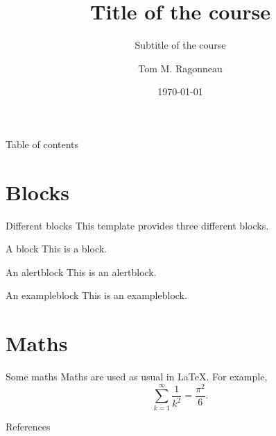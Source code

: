 \documentclass{presentation}
\title{Title of the course}
\subtitle{Subtitle of the course}
\date{\today}
\author{Tom M. Ragonneau}
\institute{
    Department of Applied Mathematics\\ 
    The Hong Kong Polytechnic University
}
\begin{document}
\maketitle

\begin{frame}{Table of contents}
    \tableofcontents[hideallsubsections]
\end{frame}

\section{Blocks}

\begin{frame}{Different blocks}
    This template provides \alert{three} different blocks.

    \begin{block}{A block}
        This is a block.
    \end{block}

    \begin{alertblock}{An alertblock}
        This is an alertblock.
    \end{alertblock}

    \begin{exampleblock}{An exampleblock}
        This is an exampleblock.
    \end{exampleblock}
\end{frame}

\section{Maths}

\begin{frame}{Some maths}
    Maths are used as usual in \LaTeX.
    For example,
    \begin{equation*}
        \sum_{k = 1}^{\infty} \frac{1}{k^2} = \frac{\pi^2}{6}.
    \end{equation*}
\end{frame}

\appendix

\begin{frame}[t,allowframebreaks]{References}
    \nocite{knut86}
    \printbibliography[heading=none]
\end{frame}
\end{document}
